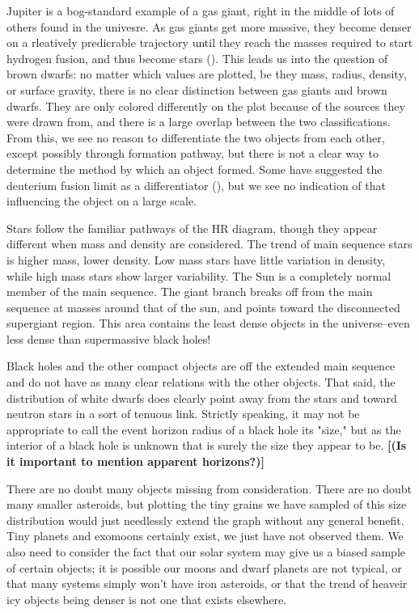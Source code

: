 \documentclass[twocolumn,linenumbers]{aastex631}
\begin{document}
Jupiter is a bog-standard example of a gas giant, right in the middle of lots of others found in the univesre. As gas giants get more massive, they become denser on a rleatively predicrable trajectory until they reach the masses required to start hydrogen fusion, and thus become stars (). This leads us into the question of brown dwarfs: no matter which values are plotted, be they mass, radius, density, or surface gravity, there is no clear distinction between gas giants and brown dwarfs. They are only colored differently on the plot because of the sources they were drawn from, and there is a large overlap between the two classifications. From this, we see no reason to differentiate the two objects from each other, except possibly through formation pathway, but there is not a clear way to determine the method by which an object formed. Some have suggested the deuterium fusion limit as a differentiator (), but we see no indication of that influencing the object on a large scale. 

Stars follow the familiar pathways of the HR diagram, though they appear different when mass and density are considered. The trend of main sequence stars is higher mass, lower density. Low mass stars have little variation in density, while high mass stars show larger variability. The Sun is a completely normal member of the main sequence. The giant branch breaks off from the main sequence at masses around that of the sun, and points toward the disconnected supergiant region. This area contains the least dense objects in the universe--even less dense than supermassive black holes! 

Black holes and the other compact objects are off the extended main sequence and do not have as many clear relations with the other objects. That said, the distribution of white dwarfs does clearly point away from the stars and toward neutron stars in a sort of tenuous link. Strictly speaking, it may not be appropriate to call the event horizon radius of a black hole its "size," but as the interior of a black hole is unknown that is surely the size they appear to be. \textbf{\color{red}[(Is it important to mention apparent horizons?)]\color{black}}

There are no doubt many objects missing from consideration. There are no doubt many smaller asteroids, but plotting the tiny grains we have sampled of this size distribution would just needlessly extend the graph without any general benefit. Tiny planets and exomoons certainly exist, we just have not observed them. We also need to consider the fact that our solar system may give us a biased sample of certain objects; it is possible our moons and dwarf planets are not typical, or that many systems simply won't have iron asteroids, or that the trend of heaveir icy objects being denser is not one that exists elsewhere. 
\end{document}

